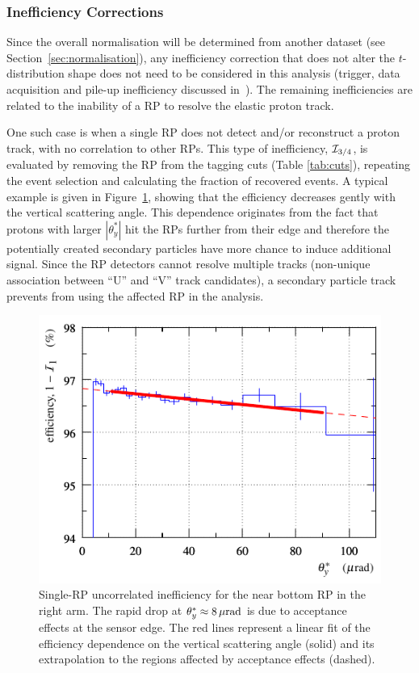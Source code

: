 
\subsubsection{Inefficiency Corrections}
\label{sec:ineff corr}

Since the overall normalisation will be determined from another dataset (see Section~\ref{sec:normalisation}), any inefficiency correction that does not alter the $t$-distribution shape does not need to be considered in this analysis (trigger, data acquisition and pile-up inefficiency discussed in~\cite{epl101-el,prl111}). The remaining inefficiencies are related to the inability of a RP to resolve the elastic proton track.

One such case is when a single RP does not detect and/or reconstruct a proton track, with no correlation to other RPs. This type of inefficiency, ${\cal I}_{3/4}$, is evaluated by removing the RP from the tagging cuts (Table \ref{tab:cuts}), repeating the event selection and calculating the fraction of recovered events. A typical example is given in Figure~\ref{fig:eff 3/4}, showing that the efficiency decreases gently with the vertical scattering angle. This dependence originates from the fact that protons with larger $|\theta_y^*|$ hit the RPs further from their edge and therefore the potentially created secondary particles have more chance to induce additional signal. Since the RP detectors cannot resolve multiple tracks (non-unique association between ``U'' and ``V'' track candidates), a secondary particle track prevents from using the affected RP in the analysis.

\begin{figure}
\begin{center}
\includegraphics{fig/eff3outof4_fits.pdf}
\caption{%
Single-RP uncorrelated inefficiency for the near bottom RP in the right arm. The rapid drop at $\theta_y^* \approx 8\,{\rm \mu rad}$ is due to acceptance effects at the sensor edge. The red lines represent a linear fit of the efficiency dependence on the vertical scattering angle (solid) and its extrapolation to the regions affected by acceptance effects (dashed).
}
\label{fig:eff 3/4}
\end{center}
\end{figure}

